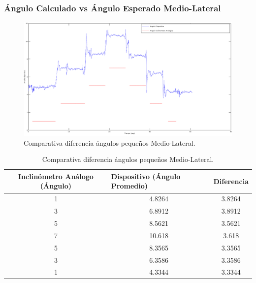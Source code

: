 \documentclass[12pt,a4paper]{article}
\begin{document}
\subsubsection{Ángulo Calculado vs Ángulo Esperado Medio-Lateral}
\begin{figure}[H]
	\centering
	\includegraphics[scale=0.4]{images/pruebas/Inclinometro/medioLateralB}
	\caption{Comparativa diferencia ángulos pequeños Medio-Lateral.}
	\label{fig:inclinometroVsDispositivoML}
\end{figure}

\begin{table}[H]
	\centering
		\begin{tabular}{|c|c|c|}
			\hline
			\textbf{Inclinómetro Análogo (Ángulo)} & \multicolumn{1}{l|}{\textbf{Dispositivo (Ángulo Promedio)}} & Diferencia				 \\ \hline
			1                                      & 4.8264                                                      & 3.8264                     \\ \hline
			3                                      & 6.8912                                                      & 3.8912                     \\ \hline
			5                                      & 8.5621                                                      & 3.5621                     \\ \hline
			7                                      & 10.618                                                      & 3.618                      \\ \hline
			5                                      & 8.3565                                                      & 3.3565                     \\ \hline
			3                                      & 6.3586                                                      & 3.3586                     \\ \hline
			1                                      & 4.3344                                                      & 3.3344                     \\ \hline
		\end{tabular}
		\caption{Comparativa diferencia ángulos pequeños Medio-Lateral.}
		\label{table:inclinometroVsDispositivoML}
\end{table}
\end{document}
